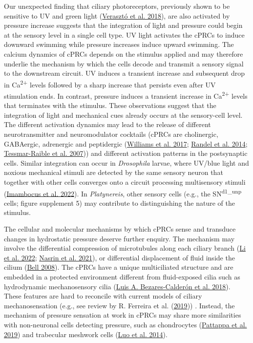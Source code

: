 \documentclass[
]{article}
\begin{document}
Our unexpected finding that ciliary photoreceptors, previously shown to
be sensitive to UV and green light
(\protect\hyperlink{ref-veraszto2018}{Verasztó et al. 2018}), are also
activated by pressure increase suggests that the integration of light
and pressure could begin at the sensory level in a single cell type. UV
light activates the cPRCs to induce downward swimming while pressure
increases induce upward swimming. The calcium dynamics of cPRCs depends
on the stimulus applied and may therefore underlie the mechanism by
which the cells decode and transmit a sensory signal to the downstream
circuit. UV induces a transient increase and subsequent drop in
Ca\textsuperscript{2+} levels followed by a sharp increase that persists
even after UV stimulation ends. In contrast, pressure induces a
transient increase in Ca\textsuperscript{2+} levels that terminates with
the stimulus. These observations suggest that the integration of light
and mechanical cues already occurs at the sensory-cell level. The
different activation dynamics may lead to the release of different
neurotransmitter and neuromodulator cocktails (cPRCs are cholinergic,
GABAergic, adrenergic and peptidergic
(\protect\hyperlink{ref-williams2017}{Williams et al. 2017};
\protect\hyperlink{ref-randel2014}{Randel et al. 2014};
\protect\hyperlink{ref-tessmar-raible2007}{Tessmar-Raible et al. 2007}))
and different activation patterns in the postsynaptic cells. Similar
integration can occur in \emph{Drosophila} larvae, where UV/blue light
and noxious mechanical stimuli are detected by the same sensory neuron
that together with other cells converges onto a circuit processing
multisensory stimuli (\protect\hyperlink{ref-imambocus2022}{Imambocus et
al. 2022}). In \emph{Platynereis}, other sensory cells (e.g., the
SN\textsuperscript{d1\_unp} cells; figure supplement 5) may contribute
to distinguishing the nature of the stimulus.

The cellular and molecular mechanisms by which cPRCs sense and transduce
changes in hydrostatic pressure deserve further enquiry. The mechanism
may involve the differential compression of microtubules along each
ciliary branch (\protect\hyperlink{ref-li2022a}{Li et al. 2022};
\protect\hyperlink{ref-nasrin2021}{Nasrin et al. 2021}), or differential
displacement of fluid inside the cilium
(\protect\hyperlink{ref-bell2008}{Bell 2008}). The cPRCs have a unique
multiciliated structure and are embedded in a protected environment
different from fluid-exposed cilia such as hydrodynamic mechanosensory
cilia (\protect\hyperlink{ref-bezares-calderon2018}{Luis A.
Bezares-Calderón et al. 2018}). These features are hard to reconcile
with current models of ciliary mechanosensation (e.g., see review by R.
Ferreira et al. (\protect\hyperlink{ref-ferreira2019}{2019})) . Instead,
the mechanism of pressure sensation at work in cPRCs may share more
similarities with non-neuronal cells detecting pressure, such as
chondrocytes (\protect\hyperlink{ref-pattappa2019}{Pattappa et al.
2019}) and trabecular meshwork cells
(\protect\hyperlink{ref-luo2014}{Luo et al. 2014}).
\end{document}
